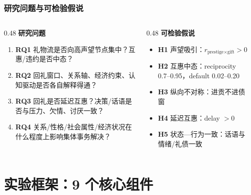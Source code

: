 \documentclass[AutoFakeBold,AutoFakeSlant]{beamer}
\begin{document}
\begin{frame}
    \frametitle{研究问题与可检验假说}
    \small
    \begin{columns}
        \begin{column}{0.48\textwidth}
            \textbf{研究问题}
            \begin{enumerate}
                \item \textbf{RQ1} 礼物流是否向高声望节点集中？互惠/违约是否中态？
                \item \textbf{RQ2} 回礼窗口、关系轴、经济约束、认知驱动是否各自解释得通？
                \item \textbf{RQ3} 回礼是否延迟互惠？决策/话语是否与压力、欠情、讨厌一致？
                \item \textbf{RQ4} 关系/性格/社会属性/经济状况在什么程度上影响集体事务解决？
            \end{enumerate}
        \end{column}
        \begin{column}{0.48\textwidth}
            \textbf{可检验假说}
            \begin{itemize}
                \item \textbf{H1} 声望吸引：$r_{\text{prestige}\times\text{gift}}>0$
                \item \textbf{H2} 互惠中态：reciprocity 0.7–0.95，default 0.02–0.20
                \item \textbf{H3} 纵向不对称：进贡不进债窗
                \item \textbf{H4} 延迟互惠：delay $>0$
                \item \textbf{H5} 状态—行为一致：话语与情绪/礼债一致
            \end{itemize}
        \end{column}
    \end{columns}
\end{frame}

\section{实验框架：9 个核心组件}
\end{document}
